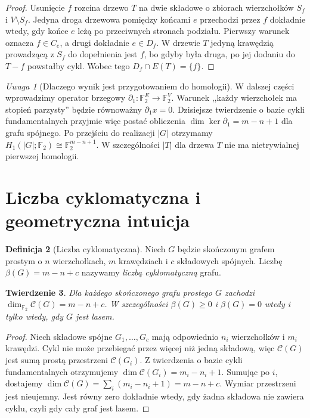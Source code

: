 \documentclass[11pt,a4paper]{report}
\numberwithin{equation}{section}
\theoremstyle{plain}
\newtheorem{twierdzenie}{Twierdzenie}[section]
\theoremstyle{definition}
\newtheorem{definicja}[twierdzenie]{Definicja}
\theoremstyle{remark}
\newtheorem{uwaga}[twierdzenie]{Uwaga}
\begin{document}
\begin{proof}
Usunięcie $f$ rozcina drzewo $T$ na
dwie składowe o zbiorach wierzchołków
$S_f$ i $V\setminus S_f$. Jedyna droga
drzewowa pomiędzy końcami $e$ przechodzi
przez $f$ dokładnie wtedy, gdy końce
$e$ leżą po przeciwnych stronach podziału.
Pierwszy warunek oznacza $f\in C_e$,
a drugi dokładnie $e\in D_f$.
W drzewie $T$ jedyną krawędzią
prowadzącą z $S_f$ do dopełnienia jest
$f$, bo gdyby była druga, po jej
dodaniu do $T-f$ powstałby cykl.
Wobec tego $D_f\cap E(T)=\{f\}$.
\end{proof}

\begin{uwaga}[Dlaczego wynik jest przygotowaniem do homologii]
W dalszej części wprowadzimy operator brzegowy
$\partial_1:\mathbb F_2^E\to\mathbb F_2^V$.
Warunek ,,każdy wierzchołek ma stopień
parzysty'' będzie równoważny $\partial_1x=0$.
Dzisiejsze twierdzenie o bazie cykli fundamentalnych
przyjmie więc postać obliczenia
$\dim\ker\partial_1=m-n+1$ dla grafu spójnego.
Po przejściu do realizacji $|G|$ otrzymamy
$H_1(|G|;\mathbb F_2)\cong\mathbb F_2^{m-n+1}$.
W szczególności $|T|$ dla drzewa $T$
nie ma nietrywialnej pierwszej homologii.
\end{uwaga}

\section{Liczba cyklomatyczna i geometryczna intuicja}
\label{sec:tg-cyklomatyczna}

\begin{definicja}[Liczba cyklomatyczna]
Niech $G$ będzie skończonym grafem prostym
o $n$ wierzchołkach, $m$ krawędziach
i $c$ składowych spójnych. Liczbę
$\beta(G)=m-n+c$ nazywamy
\emph{liczbą cyklomatyczną} grafu.
\end{definicja}

\begin{twierdzenie}
Dla każdego skończonego grafu prostego $G$
zachodzi
$\dim_{\mathbb F_2}\mathcal C(G)=m-n+c$.
W szczególności $\beta(G)\ge0$ i
$\beta(G)=0$ wtedy i tylko wtedy, gdy
$G$ jest lasem.
\end{twierdzenie}

\begin{proof}
Niech składowe spójne $G_1,\ldots,G_c$
mają odpowiednio $n_i$ wierzchołków
i $m_i$ krawędzi. Cykl nie może przebiegać
przez więcej niż jedną składową, więc
$\mathcal C(G)$ jest sumą prostą
przestrzeni $\mathcal C(G_i)$. Z twierdzenia
o bazie cykli fundamentalnych otrzymujemy
$\dim\mathcal C(G_i)=m_i-n_i+1$.
Sumując po $i$, dostajemy
$\dim\mathcal C(G)=\sum_i(m_i-n_i+1)=m-n+c$.
Wymiar przestrzeni jest nieujemny.
Jest równy zero dokładnie wtedy, gdy
żadna składowa nie zawiera cyklu, czyli
gdy cały graf jest lasem.
\end{proof}
\end{document}
